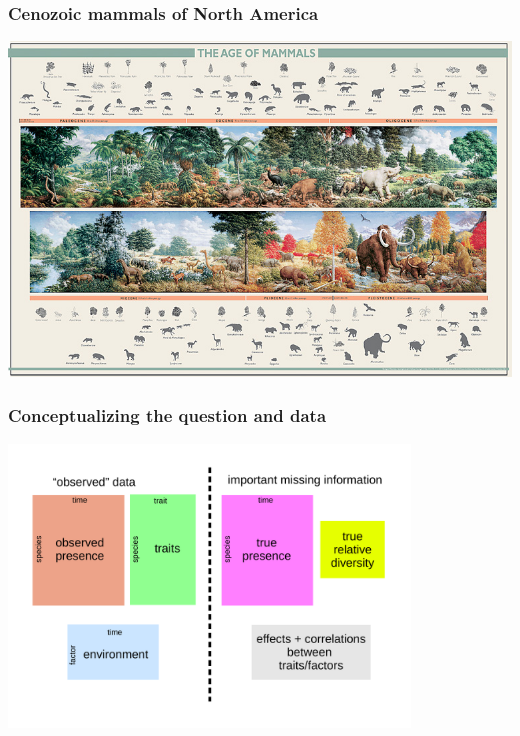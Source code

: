 \documentclass[aspectratio=169]{beamer}
\begin{document}
\begin{frame}
  \frametitle{Cenozoic mammals of North America}
  \begin{center}
    \includegraphics[height=0.775\textheight,width=\textwidth,keepaspectratio=true]{figure/aom}
  \end{center}
\end{frame}

%
%

\begin{frame}
  \frametitle{Conceptualizing the question and data}
  \begin{center}
    \includegraphics[width=0.8\textwidth,height=\textheight,keepaspectratio=true]{figure/problem_concept}
  \end{center}
\end{frame}
\end{document}
